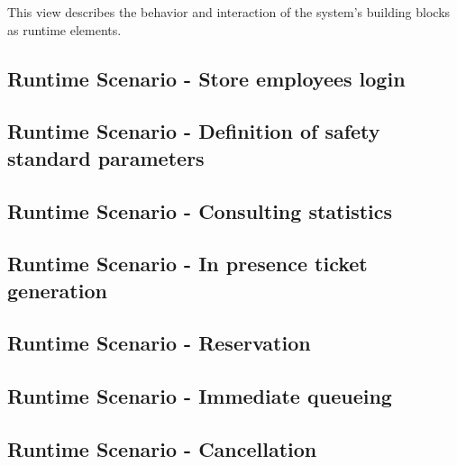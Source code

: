 \documentclass[../../main.tex]{subfiles}
\begin{document}
This view describes the behavior and interaction of the system’s building blocks as runtime elements.


\subsection{Runtime Scenario  - Store employees login}

\subsection{Runtime Scenario  - Definition of safety standard parameters}

\subsection{Runtime Scenario  - Consulting statistics}

\subsection{Runtime Scenario  - In presence ticket generation}

\subsection{Runtime Scenario  - Reservation}

\subsection{Runtime Scenario  - Immediate queueing}

\subsection{Runtime Scenario  - Cancellation}
\end{document}
